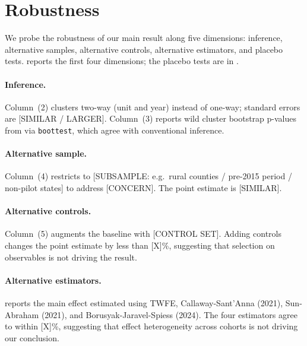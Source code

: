 
\section{Robustness}\label{sec:robustness}

We probe the robustness of our main result along five dimensions:
inference, alternative samples, alternative controls, alternative
estimators, and placebo tests.  reports the first
four dimensions; the placebo tests are in .



\paragraph{Inference.} Column~(2) clusters two-way (unit and year)
instead of one-way; standard errors are [SIMILAR / LARGER]. Column~(3)
reports wild cluster bootstrap p-values from
\citet{CameronGelbachMiller2008} via \texttt{boottest}, which agree
with conventional inference.

\paragraph{Alternative sample.} Column~(4) restricts to
[SUBSAMPLE: e.g.\ rural counties / pre-2015 period / non-pilot states]
to address [CONCERN]. The point estimate is [SIMILAR].

\paragraph{Alternative controls.} Column~(5) augments the baseline
with [CONTROL SET]. Adding controls changes the point estimate by
less than [X]\%, suggesting that selection on observables is not
driving the result.

\paragraph{Alternative estimators.}  reports
the main effect estimated using TWFE, Callaway-Sant'Anna (2021),
Sun-Abraham (2021), and Borusyak-Jaravel-Spiess (2024). The four
estimators agree to within [X]\%, suggesting that effect heterogeneity
across cohorts is not driving our conclusion.

